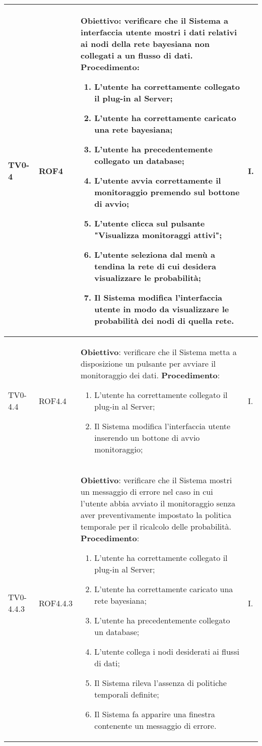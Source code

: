 \begin{longtable}{|C{.15\textwidth}|C{.13\textwidth}|m{.52\textwidth}|C{.08\textwidth}|}
TV0-4 & ROF4 &
	\textbf{Obiettivo}: verificare che il Sistema a interfaccia utente mostri i dati relativi ai nodi della rete bayesiana non collegati a un flusso di dati. \newline
	\textbf{Procedimento}:
	\begin{enumerate}
		\item L'utente ha correttamente collegato il plug-in al Server;
		\item L'utente ha correttamente caricato una rete bayesiana;
		\item L'utente ha precedentemente collegato un database;
		\item L'utente avvia correttamente il monitoraggio premendo sul bottone di avvio;
		\item L'utente clicca sul pulsante "Visualizza monitoraggi attivi";
		\item L'utente seleziona dal menù a tendina la rete di cui desidera visualizzare le probabilità;
		\item Il Sistema modifica l'interfaccia utente in modo da visualizzare le probabilità dei nodi di quella rete.
	\end{enumerate}
	& I. \\
\hline

TV0-4.4 & ROF4.4 &
	\textbf{Obiettivo}: verificare che il Sistema metta a disposizione un pulsante per avviare il monitoraggio dei dati. \newline
	\textbf{Procedimento}:
	\begin{enumerate}
		\item L'utente ha correttamente collegato il plug-in al Server;
		\item Il Sistema modifica l'interfaccia utente inserendo un bottone di avvio monitoraggio;
	\end{enumerate}
	& I. \\
\hline

TV0-4.4.3 & ROF4.4.3 &
	\textbf{Obiettivo}: verificare che il Sistema mostri un messaggio di errore nel caso in cui l'utente abbia avviato il monitoraggio senza aver preventivamente impostato la politica temporale per il ricalcolo delle probabilità. \newline
	\textbf{Procedimento}:
	\begin{enumerate}
		\item L'utente ha correttamente collegato il plug-in al Server;
		\item L'utente ha correttamente caricato una rete bayesiana;
		\item L'utente ha precedentemente collegato un database;
		\item L'utente collega i nodi desiderati ai flussi di dati;
		\item Il Sistema rileva l'assenza di politiche temporali definite;
		\item Il Sistema fa apparire una finestra contenente un messaggio di errore.
	\end{enumerate}
	& I. \\
\hline


\end{longtable}

